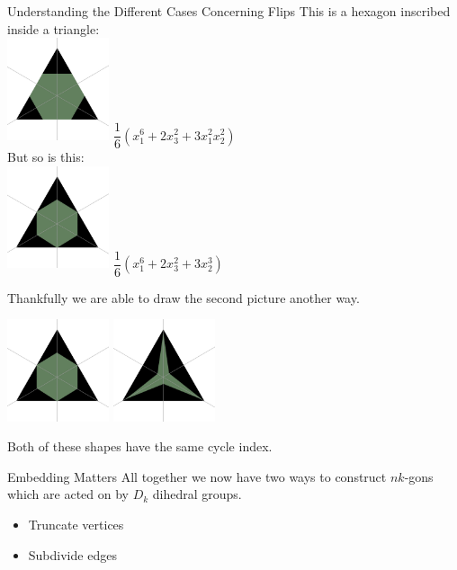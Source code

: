 \documentclass{beamer}
\begin{document}
\begin{frame}{Understanding the Different Cases Concerning Flips}
	This is a hexagon inscribed inside a triangle:\\
		\includegraphics[width=3cm]{newtriangle_copya}
		$\dfrac{1}{6}(x_1^6+2x_3^2+3x_1^2x_2^2)$\\
	But so is this:\\
		\includegraphics[width=3cm]{newtriangle_copy1}
		$\dfrac{1}{6}(x_1^6+2x_3^2+ 3x_2^3)$\\
\end{frame}
\begin{frame}
	Thankfully we are able to draw the second picture another way.
	\begin{center}
		\includegraphics[width=3cm]{newtriangle_copy1}
		\mapsto
		\includegraphics[width=3cm]{newtriangle_copyb}
	\end{center}
	Both of these shapes have the same cycle index.\\
  \end{frame}
  \begin{frame}{Embedding Matters}
	All together we now have two ways to construct $nk$-gons which are acted on by $D_k$ dihedral groups.\\
	\begin{itemize}
		\item Truncate vertices
		\item Subdivide edges
	\end{itemize}
\end{frame}
\end{document}
